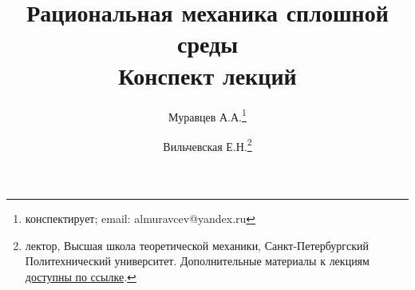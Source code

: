 \documentclass[a4paper,12pt]{article}
\begin{document}
	\tableofcontents
	\title{Рациональная механика сплошной среды\\Конспект лекций}
	\author{Муравцев А.А.\thanks{конспектирует; email: almuravcev@yandex.ru}
	\and
	Вильчевская Е.Н.\thanks{лектор, Высшая школа теоретической механики, Санкт-Петербургский Политехнический университет. Дополнительные материалы к лекциям \href{https://csspbstu-my.sharepoint.com/:f:/g/personal/muravtsev_aa_edu_spbstu_ru/Epiacj6WFMBHqIF6E3YQgCMB7yi5NAA1ycqFLqrTZMhJ4w?e=i2agP0}{доступны по ссылке}.}}
	\maketitle
	\pagestyle{fancy}
	
	\newpage
	
	\newpage
	
	\newpage
	
	\newpage
	
	\newpage
	
	\newpage
	
	\newpage
	
	\newpage
	
	\newpage
	
	\newpage
	
	\newpage
	
	\newpage
	
	\newpage
\end{document}
